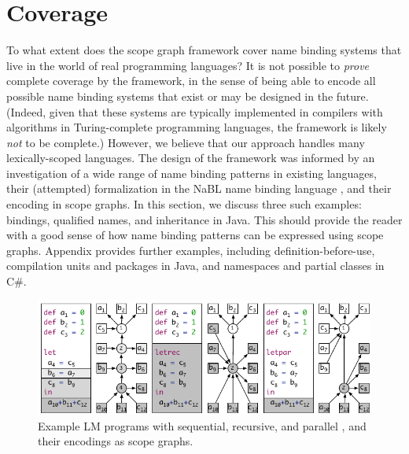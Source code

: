 \section{Coverage}

To what extent does the scope graph framework cover name binding systems that live in the
world of real programming languages? It is not possible to \emph{prove} complete
coverage by the framework, in the sense of being able to encode all possible
name binding systems that exist or may be designed in the future.
(Indeed, given that these systems are typically implemented in compilers
with algorithms in Turing-complete programming languages, the framework is likely
\emph{not} to be complete.)
However, we believe that our approach handles many lexically-scoped languages.
The design of the framework was informed by an investigation of a wide range of
name binding patterns in existing languages, their (attempted) formalization in
the NaBL name binding language \cite{KatsV10,KonatKWV12}, and their encoding in scope
graphs.
In this section, we discuss three such examples:  bindings, qualified names,
and inheritance in Java.
This should provide the reader with a good sense of how name binding patterns
can be expressed using scope graphs.
Appendix   provides further examples,
including definition-before-use, compilation units and packages in Java, and namespaces and partial classes in
C\#. 

\begin{figure}[t]
\begin{boxedminipage}{\hsize}
\centering\includegraphics{figures/scope-graphs/lets/all.pdf}
\end{boxedminipage}
\vspace*{-\baselineskip}
\caption{Example LM programs with sequential, recursive, and parallel , and
their encodings as scope graphs.}
\end{figure}

